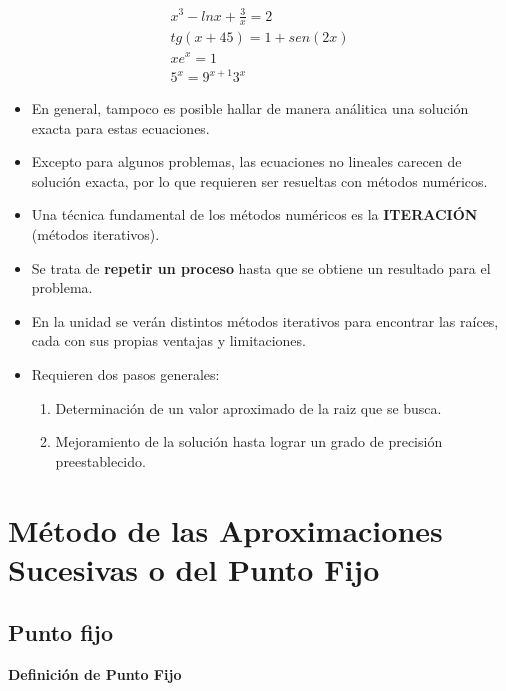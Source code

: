 \documentclass[openany]{book}
\providecommand{\tightlist}{%
  \setlength{\itemsep}{0pt}\setlength{\parskip}{0pt}}
\begin{document}
\begin{gather*}
x^3 - ln x + \frac{3}{x} = 2 \\
tg(x + 45) = 1 + sen(2x) \\
xe^{x}=1 \\
{\displaystyle 5^{x}=9^{x+1} 3^{x}}
\end{gather*}

\begin{itemize}
\item
  En general, tampoco es posible hallar de manera análitica una solución exacta para estas ecuaciones.
\item
  Excepto para algunos problemas, las ecuaciones no lineales carecen de solución exacta, por lo que requieren ser resueltas con métodos numéricos.
\item
  Una técnica fundamental de los métodos numéricos es la \textbf{ITERACIÓN} (métodos iterativos).
\item
  Se trata de \textbf{repetir un proceso} hasta que se obtiene un resultado para el problema.
\item
  En la unidad se verán distintos métodos iterativos para encontrar las raíces, cada con sus propias ventajas y limitaciones.
\item
  Requieren dos pasos generales:

  \begin{enumerate}
  \def\labelenumi{\arabic{enumi}.}
  \tightlist
  \item
    Determinación de un valor aproximado de la raiz que se busca.
  \item
    Mejoramiento de la solución hasta lograr un grado de precisión preestablecido.
  \end{enumerate}
\end{itemize}

\hypertarget{muxe9todo-de-las-aproximaciones-sucesivas-o-del-punto-fijo}{%
\section{Método de las Aproximaciones Sucesivas o del Punto Fijo}\label{muxe9todo-de-las-aproximaciones-sucesivas-o-del-punto-fijo}}

\hypertarget{punto-fijo}{%
\subsection{Punto fijo}\label{punto-fijo}}

\textbf{Definición de Punto Fijo}
\end{document}
